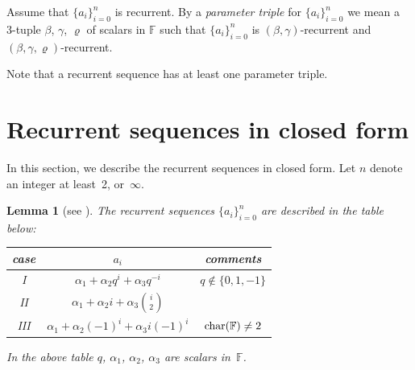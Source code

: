 \documentclass[pdftex]{sigma}
\numberwithin{equation}{section}
\newtheorem{Lemma}[Theorem]{Lemma}
\begin{document}
\begin{Definition}\label{def:pt}
Assume that $\lbrace a_i \rbrace_{i=0}^n$ is recurrent.
By a {\it parameter triple} for
$\lbrace a_i \rbrace_{i=0}^n$ we mean a 3-tuple
 $\beta$, $\gamma$, $\varrho$ of scalars in $\mathbb F$
such that $\lbrace a_i \rbrace_{i=0}^n$ is
$(\beta,\gamma)$-recurrent and $(\beta, \gamma, \varrho)$-recurrent.
\end{Definition}

Note that a recurrent sequence has at least one parameter triple.

\section{Recurrent sequences in closed form }\label{section9}

In this section, we describe the recurrent sequences in closed form.
Let $n$ denote an integer at least~2, or~$\infty$.

\begin{Lemma}[{see \cite[Lemma~9.2]{2lintrans}}]\label{lem:closedformthreetermS99}
 The recurrent sequences
 $\lbrace a_i\rbrace_{i=0}^n$
are described in the table below:
\begin{center}
\begin{tabular}[t]{c|c|c}
 {\rm case} & $a_i$ & {\rm comments}
\\
\hline
{\rm I} & $ \alpha_1 + \alpha_2 q^i + \alpha_3 q^{-i} $
&
$q\not\in \lbrace 0,1,-1\rbrace$
 \\
{\rm II} &
$ \alpha_1 + \alpha_2 i + \alpha_3 \binom{i}{2} $ &
\\
{\rm III} &
$ \alpha_1 + \alpha_2 (-1)^i + \alpha_3 i(-1)^i$ &
${\rm char}(\mathbb F)\not=2$
\\
\end{tabular}
\end{center}

In the above table $q$, $\alpha_1$, $\alpha_2$, $\alpha_3$ are scalars in~$\mathbb F$.
\end{Lemma}
\end{document}
